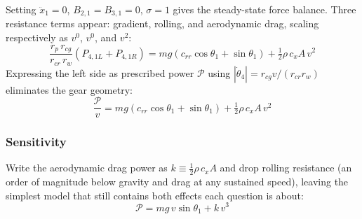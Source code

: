 \documentclass[10pt]{extarticle}
\numberwithin{equation}{subsubsection}
\begin{document}
Setting $\ddot{x}_1 = 0$, $B_{2,1} = B_{3,1} = 0$, $\sigma = 1$ gives the steady-state force balance. Three resistance terms appear: gradient, rolling, and aerodynamic drag, scaling respectively as $v^0$, $v^0$, and $v^2$:
\begin{equation}
    \frac{r_p\,r_{cg}}{r_{cr}\,r_w}\left(P_{4,1L} + P_{4,1R}\right) = mg\left(c_{rr}\cos\theta_1 + \sin\theta_1\right) + \tfrac{1}{2}\rho\,c_x A\,v^2
\end{equation}
Expressing the left side as prescribed power $\mathcal{P}$ using $|\dot{\theta}_4| = r_{cg}v/(r_{cr}r_w)$ eliminates the gear geometry:
\begin{equation}
    \frac{\mathcal{P}}{v} = mg\left(c_{rr}\cos\theta_1 + \sin\theta_1\right) + \tfrac{1}{2}\rho\,c_x A\,v^2
\end{equation}

\subsubsection{Sensitivity}


Write the aerodynamic drag power as $k \equiv \tfrac{1}{2}\rho\,c_x A$ and drop rolling resistance
(an order of magnitude below gravity and drag at any sustained speed), leaving the simplest model
that still contains both effects each question is about:
\begin{equation}
    \mathcal{P} = mg\,v\sin\theta_1 + k\,v^3
\end{equation}
\end{document}
